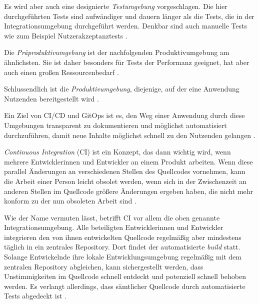 \documentclass[11pt,a4paper]{article}
\begin{document}
Es wird aber auch eine designierte \emph{Testumgebung} vorgeschlagen.
Die hier durchgeführten Tests sind aufwändiger und dauern länger als
die Tests, die in der Integrationsumgebung durchgeführt werden.
Denkbar sind auch manuelle Tests wie zum Beispiel Nutzerakzeptanztests \cite{Schmeling_Dargatz_2022}.

Die \emph{Präproduktivumgebung} ist der nachfolgenden Produktivumgebung am ähnlichsten.
Sie ist daher besonders für Tests der Performanz geeignet, hat
aber auch einen großen Ressourcenbedarf \cite{Schmeling_Dargatz_2022}.

Schlussendlich ist die \emph{Produktivumgebung}, diejenige, auf der eine Anwendung
Nutzenden bereitgestellt wird \cite{Schmeling_Dargatz_2022}.


Ein Ziel von CI/CD und GitOps ist es, den Weg einer Anwendung durch
diese Umgebungen transparent zu dokumentieren und möglichst automatisiert
durchzuführen, damit neue Inhalte möglichst schnell zu den
Nutzenden gelangen \cite{cicd_with_kubernetes}.

\emph{Continuous Integration} (CI) ist ein Konzept, das dann wichtig wird, wenn mehrere
Entwicklerinnen und Entwickler an einem Produkt arbeiten.
Wenn diese parallel Änderungen an verschiedenen Stellen des Quellcodes
vornehmen, kann die Arbeit einer Person leicht obsolet werden,
wenn sich in der Zwischenzeit an anderen Stellen im Quellcode größere
Änderungen ergeben haben, die nicht mehr konform zu der nun obsoleten Arbeit sind \cite{fowler_Continuous_Integration}.

Wie der Name vermuten lässt, betrifft CI vor allem die oben genannte Integrationsumgebung.
Alle beteiligten Entwicklerinnen und Entwickler integrieren den von ihnen
entwickelten Quellcode regelmäßig aber mindestens täglich in ein zentrales
Repository. Dort findet der automatisierte \emph{build} statt.
Solange Entwickelnde ihre lokale Entwicklungsumgebung regelmäßig mit dem
zentralen Repository abgleichen, kann sichergestellt werden, dass
Unstimmigkeiten im Quellcode schnell entdeckt und potenziell schnell behoben werden.
Es verlangt allerdings, dass sämtlicher Quellcode durch automatisierte
Tests abgedeckt ist \cite{fowler_Continuous_Integration}.
\end{document}
